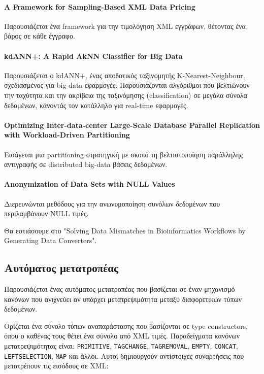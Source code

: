     \paragraph{A Framework for Sampling-Based XML Data Pricing}
        Παρουσιάζεται ένα framework για την τιμολόγηση XML εγγράφων, θέτοντας ένα βάρος σε κάθε έγγραφο.

    \paragraph{kdANN+: A Rapid AkNN Classifier for Big Data}
        Παρουσιάζεται ο kdANN+, ένας αποδοτικός ταξινομητής K-Nearest-Neighbour, σχεδιασμένος για big data εφαρμογές.
        Παρουσιάζονται αλγόριθμοι που βελτιώνουν την ταχύτητα και την ακρίβεια της ταξινόμησης (classification) σε μεγάλα σύνολα δεδομένων, κάνοντάς τον κατάλληλο για real-time εφαρμογές.

    \paragraph{Optimizing Inter-data-center Large-Scale Database Parallel Replication with Workload-Driven Partitioning}
        Εισάγεται μια partitioning στρατηγική με σκοπό τη βελτιστοποίηση παράλληλης αντιγραφής σε distributed big-data βάσεις δεδομένων.

    \paragraph{Anonymization of Data Sets with NULL Values}
        Διερευνώνται μεθόδους για την ανωνυμοποίηση συνόλων δεδομένων που περιλαμβάνουν NULL τιμές.

    \noindent Θα εστιάσουμε στο "Solving Data Mismatches in Bioinformatics Workflows by Generating Data Converters".

    \subsection{Αυτόματος μετατροπέας}
        Παρουσιάζεται ένας αυτόματος μετατροπέας που βασίζεται σε έναν μηχανισμό κανόνων που ανιχνεύει αν υπάρχει μετατρεψιμότητα μεταξύ διαφορετικών τύπων δεδομένων.

        Ορίζεται ένα σύνολο τύπων αναπαράστασης που βασίζονται σε type constructors, όπου ο καθένας τους θέτει ένα σύνολο από XML τιμές.
        Παραδείγματα κανόνων μετατρεψιμότητας είναι: \texttt{PRIMITIVE}, \texttt{TAGCHANGE}, \texttt{TAGREMOVAL}, \texttt{EMPTY}, \texttt{CONCAT}, \texttt{LEFTSELECTION}, \texttt{MAP} και άλλοι.
        Αυτοί δημιουργούν αντίστοιχες συναρτήσεις που μετατρέπουν τις εισόδους σε XML:

